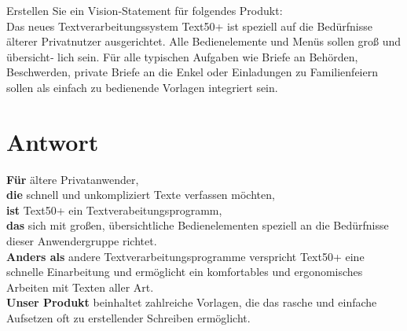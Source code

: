 Erstellen Sie ein Vision‐Statement für folgendes Produkt:\\
Das neues Textverarbeitungssystem Text50+ ist speziell auf die Bedürfnisse älterer
Privatnutzer ausgerichtet.
Alle Bedienelemente und Menüs sollen groß und übersicht‐
lich sein.
Für alle typischen Aufgaben wie Briefe an Behörden, Beschwerden, private
Briefe an die Enkel oder Einladungen zu Familienfeiern sollen als einfach zu bedienende Vorlagen integriert sein.


\section*{Antwort}

\textbf{Für} ältere Privatanwender,\\
\textbf{die} schnell und unkompliziert Texte verfassen möchten,\\
\textbf{ist} Text50+ ein Textverabeitungsprogramm,\\
\textbf{das} sich mit großen, übersichtliche Bedienelementen  speziell an die Bedürfnisse dieser Anwendergruppe richtet.\\
\textbf{Anders als} andere Textverarbeitungsprogramme verspricht Text50+ eine schnelle Einarbeitung und ermöglicht ein komfortables und ergonomisches Arbeiten mit Texten aller Art.\\
\textbf{Unser Produkt} beinhaltet  zahlreiche Vorlagen, die das rasche und einfache Aufsetzen oft zu erstellender Schreiben  ermöglicht.